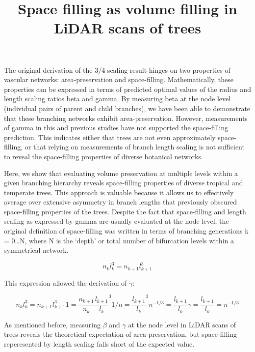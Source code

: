 \documentclass[]{article}
\title{Space filling as volume filling in LiDAR scans of trees}
\author{}
\date{\vspace{-2.5em}}
\begin{document}
\maketitle

The original derivation of the 3/4 scaling result hinges on two
properties of vascular networks: area-preservation and space-filling.
Mathematically, these properties can be expressed in terms of predicted
optimal values of the radius and length scaling ratios beta and gamma.
By measuring beta at the node level (individual pairs of parent and
child branches), we have been able to demonstrate that these branching
networks exhibit area-preservation. However, measurements of gamma in
this and previous studies have not supported the space-filling
prediction. This indicates either that trees are not even approximately
space-filling, or that relying on measurements of branch length scaling
is not sufficient to reveal the space-filling properties of diverse
botanical networks.

Here, we show that evaluating volume preservation at multiple levels
within a given branching hierarchy reveals space-filling properties of
diverse tropical and temperate trees. This approach is valuable because
it allows us to effectively average over extensive asymmetry in branch
lengths that previously obscured space-filling properties of the trees.
Despite the fact that space-filling and length scaling as expressed by
gamma are usually evaluated at the node level, the original definition
of space-filling was written in terms of branching generations k =
0\ldots{}N, where N is the `depth' or total number of bifurcation levels
within a symmetrical network.

\begin{equation}
n_{k}l_{k}^{3} = n_{k+1}l_{k+1}^{3} 
\end{equation}

This expression allowed the derivation of \(\gamma\):

\begin{equation}
n_{k}l_{k}^{3} = n_{k+1}l_{k+1}^{3} 
1 = \frac{n_{k+1}}{n_{k}}\frac{l_{k+1}}{l_{k}}^{3}
1/n = \frac{l_{k+1}}{l_{k}}^{3}
n^{-1/3} = \frac{l_{k+1}}{l_{k}}
\gamma = \frac{l_{k+1}}{l_{k}} = n^{-1/3}
\end{equation}

As mentioned before, measuring \(\beta\) and \(\gamma\) at the node
level in LiDAR scans of trees reveals the theoretical expectation of
area-preservation, but space-filling reperesented by length scaling
falls short of the expected value.
\end{document}
